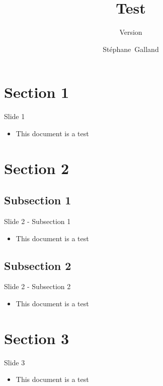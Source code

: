 \documentclass{ciadbeamer}
\title{Test}
\subtitle{Version \insertciadbeamerthemeversion}
\author[S.~Galland]{St\'ephane~Galland}
\begin{document}
\tableofcontentslide

\section{Section 1}

\begin{frame}{Slide 1}
	\begin{itemize}
	\item This document is a test
	\end{itemize}
\end{frame}

\section{Section 2}

\subsection{Subsection 1}

\begin{frame}{Slide 2 - Subsection 1}
	\begin{itemize}
	\item This document is a test
	\end{itemize}
\end{frame}

\subsection{Subsection 2}

\begin{frame}{Slide 2 - Subsection 2}
	\begin{itemize}
	\item This document is a test
	\end{itemize}
\end{frame}

\section{Section 3}

\begin{frame}{Slide 3}
	\begin{itemize}
	\item This document is a test
	\end{itemize}
\end{frame}
\end{document}
